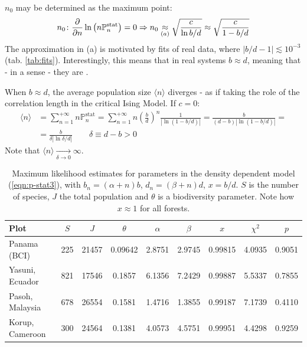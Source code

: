 \documentclass[../../main.tex]{subfiles}
\begin{document}
$n_0$ may be determined as the maximum point:
\begin{align*}
    n_0 \colon \pdv{n} \ln \left(n \mathbb{P}_n^{\mathrm{stat} }\right) = 0 \Rightarrow n_0 \underset{(a)}{\approx}  \sqrt{\frac{c}{\ln b/d} } \approx \sqrt{\frac{c}{1-b/d} }
\end{align*}
The approximation in (a) is motivated by fits of real data, where $|b/d - 1| \lesssim 10^{-3}$ (tab. \ref{tab:fits}). Interestingly, this means that in real systems $b \approx d$, meaning that - in a sense - they are . 

When $b \approx d$, the average population size $\langle n \rangle$ diverges - as if taking the role of the correlation length in the critical Ising Model.  If $c=0$:
\begin{align*}
    \langle n \rangle &= \sum_{n=1}^{+\infty} n \mathbb{P}_n^{\mathrm{stat}} = \sum_{n=1}^{+\infty} n \left(\frac{b}{d} \right)^n \frac{1}{|\ln (1-b/d)|}  = \frac{b}{(d-b)|\ln(1-b/d)|} =\\
    &= \frac{b}{\delta |\ln \delta/d|}  \qquad \delta \equiv d-b > 0
\end{align*}
Note that $\langle n \rangle  \xrightarrow[\delta \to 0]{}  \infty$.

\begin{table}[htp]
    \centering
    \begin{tabular}{lcccccccc}
        \toprule \textbf{Plot}  & $S$ & $J$ & $\theta$ & $\alpha$ & $\beta$ & $x$ & $\chi^{2}$ & $p$ \\ \midrule
        Panama (BCI) & 225 & 21457 & 0.09642 & 2.8751 & 2.9745 & 0.99815 & 4.0935 & 0.9051 \\
        Yasuni, Ecuador & 821 & 17546 & 0.1857 & 6.1356 & 7.2429 & 0.99887 & 5.5337 & 0.7855 \\
        Pasoh, Malaysia & 678 & 26554 & 0.1581 & 1.4716 & 1.3855 & 0.99187 & 7.1739 & 0.4110 \\
        Korup, Cameroon & 300 & 24564 & 0.1381 & 4.0573 & 4.5751 & 0.99951 & 4.4298 & 0.9259 \\
        \bottomrule
    \end{tabular}
    \caption{Maximum likelihood estimates for parameters in the density dependent model (\ref{eqn:p-stat3}), with $b_n = (\alpha + n)b$, $d_n = (\beta + n)d$, $x = b/d$. $S$ is the number of species, $J$ the total population and $\theta$ is a biodiversity parameter. Note how $x \approx 1$ for all forests.}
\end{table}
\end{document}
